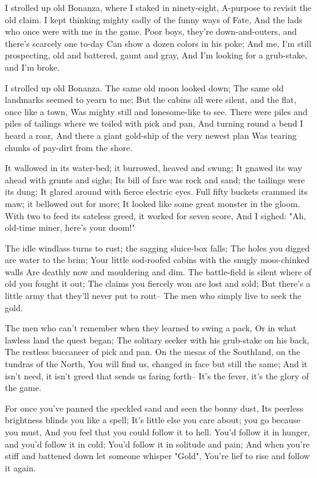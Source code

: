 
\begin{poemblock}
 I strolled up old Bonanza, where I staked in ninety-eight,
  A-purpose to revisit the old claim.
 I kept thinking mighty sadly of the funny ways of Fate,
  And the lads who once were with me in the game.
 Poor boys, they're down-and-outers, and there's scarcely one to-day
  Can show a dozen colors in his poke;
 And me, I'm still prospecting, old and battered, gaunt and gray,
  And I'm looking for a grub-stake, and I'm broke.

 I strolled up old Bonanza.  The same old moon looked down;
  The same old landmarks seemed to yearn to me;
 But the cabins all were silent, and the flat, once like a town,
  Was mighty still and lonesome-like to see.
 There were piles and piles of tailings where we toiled with pick and pan,
  And turning round a bend I heard a roar,
 And there a giant gold-ship of the very newest plan
  Was tearing chunks of pay-dirt from the shore.

 It wallowed in its water-bed; it burrowed, heaved and swung;
  It gnawed its way ahead with grunts and sighs;
 Its bill of fare was rock and sand; the tailings were its dung;
  It glared around with fierce electric eyes.
 Full fifty buckets crammed its maw; it bellowed out for more;
  It looked like some great monster in the gloom.
 With two to feed its sateless greed, it worked for seven score,
  And I sighed:  "Ah, old-time miner, here's your doom!"

 The idle windlass turns to rust; the sagging sluice-box falls;
  The holes you digged are water to the brim;
 Your little sod-roofed cabins with the snugly moss-chinked walls
  Are deathly now and mouldering and dim.
 The battle-field is silent where of old you fought it out;
  The claims you fiercely won are lost and sold;
 But there's a little army that they'll never put to rout--
  The men who simply live to seek the gold.

 The men who can't remember when they learned to swing a pack,
  Or in what lawless land the quest began;
 The solitary seeker with his grub-stake on his back,
  The restless buccaneer of pick and pan.
 On the mesas of the Southland, on the tundras of the North,
  You will find us, changed in face but still the same;
 And it isn't need, it isn't greed that sends us faring forth--
  It's the fever, it's the glory of the game.

 For once you've panned the speckled sand and seen the bonny dust,
  Its peerless brightness blinds you like a spell;
 It's little else you care about; you go because you must,
  And you feel that you could follow it to hell.
 You'd follow it in hunger, and you'd follow it in cold;
  You'd follow it in solitude and pain;
 And when you're stiff and battened down let someone whisper "Gold",
  You're lief to rise and follow it again.


\end{poemblock}
